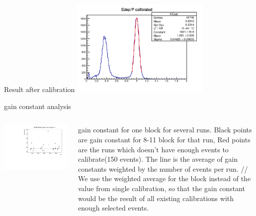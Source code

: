 \documentclass[aspectratio=169,xcolor=dvipsnames]{beamer}
\begin{document}
\begin{frame}{Result after calibration}
  \includegraphics[width = 0.5\textwidth]{run6490aftercalib.png}
\end{frame}

\begin{frame}{gain constant analysis}
    \begin{columns}
    \begin{column}[T]{0.5\textwidth}
    \includegraphics[width = \textwidth]{cal_gain_8_11.pdf}
    \end{column}{}
    \begin{column}[T]{0.5\textwidth}
      gain constant for one block for several runs. Black points are gain constant for 8-11 block for that run, Red points are the runs which doesn't have enough events to calibrate(150 events). The line is the average of gain constants weighted by the number of events per run.  
    //
     We use the weighted average for the block instead of the value from single calibration, so that the gain constant would be the result of all existing calibrations with enough selected events. 
    \end{column}{}
    \end{columns}
    \end{frame}{}
\end{document}
